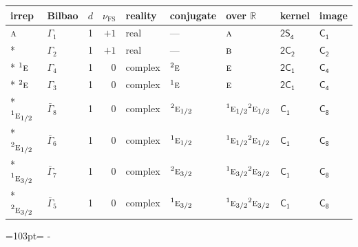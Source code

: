 \documentclass[10pt,a4paper]{article}
\makeatletter
\def\grouprule#1#2{\noalign{\marks\LTgroupmarks{\the\belowrulesep}\nobreak\vskip#1%
  \vskip\aboverulesep}\multispan\LT@cols\unskip{\leaders\hrule\@height#2\hfill\kern\z@}\cr
  \noalign{\penalty\LTrulebreak\vskip\belowrulesep\global\@lastruleclass\z@}}
\newcommand{\needspace}[1]{\par\penalty-100\begingroup\dimen0=#1\relax\dimen2=\pagegoal
  \advance\dimen2-\pagetotal\ifdim\dimen0>\dimen2\relax\ifdim\dimen2>0pt\vfil\break\fi\fi
  \endgroup}
\numberwithin{equation}{section}
\newcommand{\grp}[1]{\mathsf{#1}}
\newcommand{\irr}[1]{\text{\normalfont\scshape #1}}
\newcommand{\conjpair}[1]{{}^{#1}}
\newcommand{\detbox}[1]{{\setlength{\fboxsep}{1pt}\fbox{#1}}}
\newcommand{\fsind}{\nu_{\mathrm{FS}}}
\makeatother
\begin{document}
{\small\renewcommand{\arraystretch}{1.25}\setlength{\tabcolsep}{4pt}\begin{longtable}{@{}llrrlllll@{}}\toprule
irrep & Bilbao & $d$ & $\fsind$ & reality & conjugate & over $\mathbb{R}$ & kernel & image\\\midrule\endhead
\bottomrule\endfoot\endlastfoot
$\irr{a}$ & $\Gamma_{1}$ & 1 & $+1$ & real & --- & $\irr{a}$ & \href{2S4.pdf}{$\grp{2S_{4}}$} & \href{../../../rotation/data/pdf/C1.pdf}{$\grp{C_{1}}$}\\*
\detbox{$\irr{b}$} & $\Gamma_{2}$ & 1 & $+1$ & real & --- & $\irr{b}$ & \href{2C2.pdf}{$\grp{2C_{2}}$} & \href{../../../rotation/data/pdf/C2.pdf}{$\grp{C_{2}}$}\\*
$\conjpair{1}\irr{e}$ & $\Gamma_{4}$ & 1 & $0$ & complex & $\conjpair{2}\irr{e}$ & $\irr{e}$ & \href{2C1.pdf}{$\grp{2C_{1}}$} & \href{../../../rotation/data/pdf/C4.pdf}{$\grp{C_{4}}$}\\*
$\conjpair{2}\irr{e}$ & $\Gamma_{3}$ & 1 & $0$ & complex & $\conjpair{1}\irr{e}$ & $\irr{e}$ & \href{2C1.pdf}{$\grp{2C_{1}}$} & \href{../../../rotation/data/pdf/C4.pdf}{$\grp{C_{4}}$}\\*
\grouprule{0pt}{\lightrulewidth}
$\conjpair{1}\irr{e}_{1/2}$ & $\bar{\Gamma}_{8}$ & 1 & $0$ & complex & $\conjpair{2}\irr{e}_{1/2}$ & $\conjpair{1}\irr{e}_{1/2}\conjpair{2}\irr{e}_{1/2}$ & \href{C1.pdf}{$\grp{C_{1}}$} & \href{../../../rotation/data/pdf/C8.pdf}{$\grp{C_{8}}$}\\*
$\conjpair{2}\irr{e}_{1/2}$ & $\bar{\Gamma}_{6}$ & 1 & $0$ & complex & $\conjpair{1}\irr{e}_{1/2}$ & $\conjpair{1}\irr{e}_{1/2}\conjpair{2}\irr{e}_{1/2}$ & \href{C1.pdf}{$\grp{C_{1}}$} & \href{../../../rotation/data/pdf/C8.pdf}{$\grp{C_{8}}$}\\*
$\conjpair{1}\irr{e}_{3/2}$ & $\bar{\Gamma}_{7}$ & 1 & $0$ & complex & $\conjpair{2}\irr{e}_{3/2}$ & $\conjpair{1}\irr{e}_{3/2}\conjpair{2}\irr{e}_{3/2}$ & \href{C1.pdf}{$\grp{C_{1}}$} & \href{../../../rotation/data/pdf/C8.pdf}{$\grp{C_{8}}$}\\*
$\conjpair{2}\irr{e}_{3/2}$ & $\bar{\Gamma}_{5}$ & 1 & $0$ & complex & $\conjpair{1}\irr{e}_{3/2}$ & $\conjpair{1}\irr{e}_{3/2}\conjpair{2}\irr{e}_{3/2}$ & \href{C1.pdf}{$\grp{C_{1}}$} & \href{../../../rotation/data/pdf/C8.pdf}{$\grp{C_{8}}$}\\
\bottomrule\end{longtable}}
\needspace{103pt}
\end{document}
